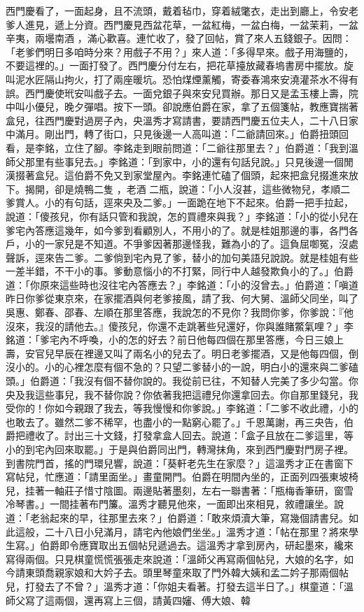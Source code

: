 \begin{showcontents}{}
西門慶看了，一面起身，且不流頭，戴着毡巾，穿着絨氅衣，走出到廳上，令安老爹人進見，遞上分資。西門慶見西盆花草，一盆紅梅，一盆白梅，一盆茉莉，一盆辛夷，兩壜南酒 ，滿心歡喜。連忙收了，發了回帖，賞了來人五錢銀子。因問：「老爹們明日多咱時分來？用戲子不用？」來人道：「多得早來。戲子用海鹽的，不要這裡的。」一面打發了。西門慶分付左右，把花草擡放藏春塢書房中擺放。旋叫泥水匠隔山拘火，打了兩座暖坑。恐怕煤煙薰觸，寄委春鴻來安澆灌茶水不得有誤。西門慶使玳安叫戲子去。一面兌銀子與來安兒買辦。那日又是孟玉樓上壽，院中叫小優兒，晚夕彈唱。按下一頭。卻說應伯爵在家，拿了五個箋帖，教應寶揣著盒兒，往西門慶對過房子內，央溫秀才寫請書，要請西門慶五位夫人，二十八日家中滿月。剛出門，轉了街口，只見後邊一人高叫道：「二爺請回來。」伯爵扭頭回看，是李銘，立住了腳。李銘走到眼前問道：「二爺往那里去？」伯爵道：「我到溫師父那里有些事兒去。」李銘道：「到家中，小的還有句話兒說。」只見後邊一個閒漢掇著盒兒。這伯爵不免又到家堂屋內。李銘連忙磕了個頭，起來把盒兒掇進來放下。揭開，卻是燒鴨二隻 ，老酒 二瓶，說道：「小人沒甚，這些微物兒，孝順二爹賞人。小的有句話，逕來央及二爹。」一面跪在地下不起來。伯爵一把手拉起，說道：「傻孩兒，你有話只管和我說，怎的買禮來與我？」李銘道：「小的從小兒在爹宅內答應這幾年，如今爹到看顧別人，不用小的了。就是桂姐那邊的事，各門各戶，小的一家兒是不知道。不爭爹因著那邊怪我，難為小的了。這負屈啣冤，沒處聲訴，逕來告二爹。二爹倘到宅內見了爹，替小的加句美語兒說說。就是桂姐有些一差半錯，不干小的事。爹動意惱小的不打緊，同行中人越發欺負小的了。」伯爵道：「你原來這些時也沒往宅內答應去？」李銘道：「小的沒曾去。」伯爵道：「嗔道昨日你爹從東京來，在家擺酒與何老爹接風，請了我、何大舅、溫師父同坐，叫了吳惠、鄭春、邵春、左順在那里答應，我說怎的不見你？我問你爹，你爹說：『他沒來，我沒的請他去。』傻孩兒，你還不走跳著些兒還好，你與誰賭鱉氣哩？」李銘道：「爹宅內不呼喚，小的怎的好去？前日他每四個在那里答應，今日三娘上壽，安官兒早辰在裡邊又叫了兩名小的兒去了。明日老爹擺酒，又是他每四個，倒沒小的。小的心裡怎麼有個不急的？只望二爹替小的一說，明白小的還來與二爹磕頭。」伯爵道：「我沒有個不替你說的。我從前已往，不知替人完美了多少勾當。你央及我這些事兒，我不替你說？你依著我把這禮兒你還拿回去。你自那里錢兒，我受你的！你如今親跟了我去，等我慢慢和你爹說。」李銘道：「二爹不收此禮，小的也敢去了。雖然二爹不稀罕，也盡小的一點窮心罷了。」千恩萬謝，再三央告，伯爵把禮收了。討出三十文錢，打發拿盒人回去。說道：「盒子且放在二爹這里，等小的到宅內回來取罷。」于是與伯爵同出門，轉灣抹角，來到西門慶對門房子裡。到書院門首，搖的門環兒響，說道：「葵軒老先生在家麼？」這溫秀才正在書窗下寫帖兒，忙應道：「請里面坐。」畫童開門。伯爵在明間內坐的，正面列四張東坡椅兒，挂著一軸莊子惜寸陰圖。兩邊貼著墨刻，左右一聯書著：「瓶梅香筆研，窗雪冷琴書。」一間挂著布門簾。溫秀才聽見他來，一面即出來相見，敘禮讓坐。說道：「老翁起來的早，往那里去來？」伯爵道：「敢來煩瀆大筆，寫幾個請書兒。如此這般，二十八日小兒滿月，請宅內他娘們坐坐。」溫秀才道：「帖在那里？將來學生寫。」伯爵即令應寶取出五個帖兒遞過去。這溫秀才拿到房內，研起墨來，纔來寫得兩個。只見棋童慌慌張張走來說道：「溫師父再寫兩個帖兒，大娘的名字，如今請東頭喬親家娘和大妗子去。頭里琴童來取了門外韓大姨和孟二妗子那兩個帖兒，打發去了不曾？」溫秀才道：「你姐夫看著。打發去這半日了。」棋童道：「溫師父寫了這兩個，還再寫上三個，請黃四嬸、傅大娘、韓
\end{showcontents}
